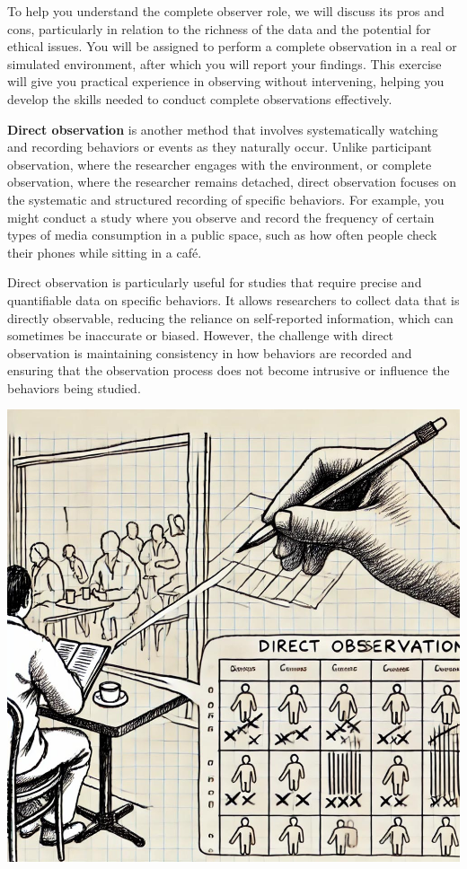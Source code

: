 \documentclass[
]{book}
\begin{document}
To help you understand the complete observer role, we will discuss its pros and cons, particularly in relation to the richness of the data and the potential for ethical issues. You will be assigned to perform a complete observation in a real or simulated environment, after which you will report your findings. This exercise will give you practical experience in observing without intervening, helping you develop the skills needed to conduct complete observations effectively.

\textbf{Direct observation} is another method that involves systematically watching and recording behaviors or events as they naturally occur. Unlike participant observation, where the researcher engages with the environment, or complete observation, where the researcher remains detached, direct observation focuses on the systematic and structured recording of specific behaviors. For example, you might conduct a study where you observe and record the frequency of certain types of media consumption in a public space, such as how often people check their phones while sitting in a café.

Direct observation is particularly useful for studies that require precise and quantifiable data on specific behaviors. It allows researchers to collect data that is directly observable, reducing the reliance on self-reported information, which can sometimes be inaccurate or biased. However, the challenge with direct observation is maintaining consistency in how behaviors are recorded and ensuring that the observation process does not become intrusive or influence the behaviors being studied.

\includegraphics[width=1\textwidth,height=\textheight]{images/fig042.jpg}
\end{document}
